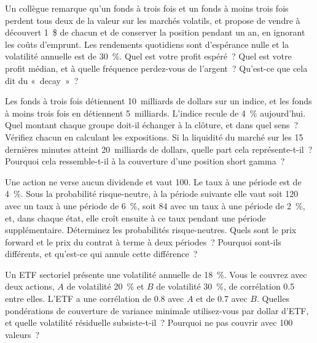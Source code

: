 \begin{question}\label{iq:iv2:etfs-futures-and-index-arbitrage:26}
Un collègue remarque qu'un fonds à trois fois et un fonds à moins trois fois perdent tous deux de la valeur sur les marchés volatils, et propose de vendre à découvert 1~\$ de chacun et de conserver la position pendant un an, en ignorant les coûts d'emprunt. Les rendements quotidiens sont d'espérance nulle et la volatilité annuelle est de 30~\%. Quel est votre profit espéré~? Quel est votre profit médian, et à quelle fréquence perdez-vous de l'argent~? Qu'est-ce que cela dit du «~decay~»~?
\end{question}

\begin{question}\label{iq:iv2:etfs-futures-and-index-arbitrage:27}
Les fonds à trois fois détiennent 10~milliards de dollars sur un indice, et les fonds à moins trois fois en détiennent 5~milliards. L'indice recule de 4~\% aujourd'hui. Quel montant chaque groupe doit-il échanger à la clôture, et dans quel sens~? Vérifiez chacun en calculant les expositions. Si la liquidité du marché sur les 15 dernières minutes atteint 20~milliards de dollars, quelle part cela représente-t-il~? Pourquoi cela ressemble-t-il à la couverture d'une position short gamma~?
\end{question}

\begin{question}\label{iq:iv2:etfs-futures-and-index-arbitrage:28}
Une action ne verse aucun dividende et vaut 100. Le taux à une période est de 4~\%. Sous la probabilité risque-neutre, à la période suivante elle vaut soit 120 avec un taux à une période de 6~\%, soit 84 avec un taux à une période de 2~\%, et, dans chaque état, elle croît ensuite à ce taux pendant une période supplémentaire. Déterminez les probabilités risque-neutres. Quels sont le prix forward et le prix du contrat à terme à deux périodes~? Pourquoi sont-ils différents, et qu'est-ce qui annule cette différence~?
\end{question}

\begin{question}\label{iq:iv2:etfs-futures-and-index-arbitrage:29}
Un ETF sectoriel présente une volatilité annuelle de 18~\%. Vous le couvrez avec deux actions, $A$ de volatilité 20~\% et $B$ de volatilité 30~\%, de corrélation 0.5 entre elles. L'ETF a une corrélation de 0.8 avec $A$ et de 0.7 avec $B$. Quelles pondérations de couverture de variance minimale utilisez-vous par dollar d'ETF, et quelle volatilité résiduelle subsiste-t-il~? Pourquoi ne pas couvrir avec 100 valeurs~?
\end{question}

